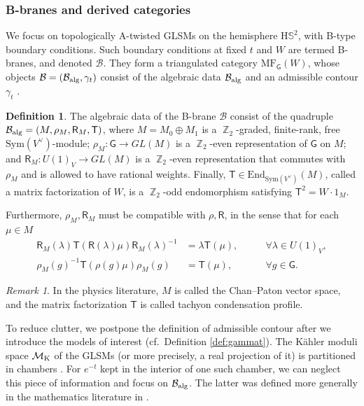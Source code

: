 \documentclass[12pt,a4paper,oneside]{amsart}
\numberwithin{equation}{section}
\theoremstyle{definition}
\newtheorem{defin}[thm]{Definition}
\theoremstyle{remark}
\newtheorem{rmk}[thm]{Remark}
\DeclareMathOperator{\Z}{\mathbb{Z}}
\newcommand{\hs}{\mathrm{H}\mathbb{S}^2}
\newcommand{\mM}{\mathcal{M}}
\newcommand{\sR}{\mathsf{R}}
\newcommand{\sG}{\mathsf{G}}
\newcommand{\sT}{\mathsf{T}}
\newcommand{\Br}{\mathcal{B}}
\newcommand{\MF}{\mathrm{MF}}
\begin{document}
\subsubsection{B-branes and derived categories}
We focus on topologically A-twisted GLSMs \cite{Witten:1988xj} on the hemisphere $\hs$, with B-type boundary conditions. Such boundary conditions at fixed $t$ and $W$ are termed B-branes, and denoted $\Br$. They form a triangulated category $\MF_{\sG} (W)$, whose objects $\Br =(\Br_{\text{\rm alg}}, \gamma_t)$ consist of the algebraic data $\Br_{\text{\rm alg}}$ \cite{Herbst:2008jq,Ballard:2016ncw} and an admissible contour $\gamma_t$ \cite{Hori:2013ika}.
\begin{defin}
The algebraic data of the B-brane $\Br$ consist of the quadruple $\Br_{\text{\rm alg}}= (M, \rho_M, \sR_M, \sT)$, where $M=M_0\oplus M_1$ is a $\Z_2$-graded, finite-rank, free $\mathrm{Sym}(V^{\vee})$-module; $\rho_{M} : \sG \to GL(M)$ is a $\Z_2$-even representation of $\sG$ on $M$; and $\sR_{M} : U(1)_V \to GL(M)$ is a $\Z_2$-even representation that commutes with $\rho_M$ and is allowed to have rational weights. Finally, $\sT \in \mathrm{End}_{\mathrm{Sym}(V^{\vee})} (M)$, called a matrix factorization of $W$, is a $\Z_2$-odd endomorphism satisfying $\sT^2 = W \cdot 1_M$.\par
Furthermore, $\rho_M, \sR_M$ must be compatible with $\rho , \sR$, in the sense that for each $\mu\in M$
\begin{equation*}
\begin{aligned}
	\sR_M (\lambda) \sT (\sR (\lambda) \mu ) \sR_M (\lambda)^{-1} &= \lambda \sT (\mu) , \qquad & \forall \lambda \in U(1)_V , \\ 
	\rho_M (g)^{-1} \sT (\rho  (g) \mu ) \rho_M (g) &= \sT (\mu) , \qquad & \forall g \in \sG . 
\end{aligned}
\end{equation*}
\end{defin}
\begin{rmk}In the physics literature, $M$ is called the Chan--Paton vector space, and the matrix factorization $\sT$ is called tachyon condensation profile.
\end{rmk}
To reduce clutter, we postpone the definition of admissible contour after we introduce the models of interest (cf.~Definition \ref{def:gammat}). The K\"ahler moduli space $\mM_{\text{\rm K}}$ of the GLSMs (or more precisely, a real projection of it) is partitioned in chambers \cite{Aspinwall:1993nu}. For $e^{-t}$ kept in the interior of one such chamber, we can neglect this piece of information and focus on $\Br_{\text{\rm alg}}$. The latter was defined more generally in the mathematics literature in \cite{Ballard:2016ncw}.\par
\end{document}
